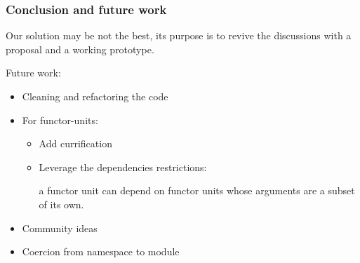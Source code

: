 \documentclass{beamer}
\begin{document}
\begin{frame}
\frametitle{Conclusion and future work}

Our solution may be not the best, its purpose is to revive the discussions with
a proposal and a working prototype. 

\medskip

Future work:
\begin{itemize}
  \item Cleaning and refactoring the code
  \item For functor-units:
    \begin{itemize}
      \item Add currification
      \item Leverage the dependencies restrictions:

        a functor unit can depend on functor units whose arguments are a subset
        of its own.
    \end{itemize}
  \item Community ideas
  \item Coercion from namespace to module
\end{itemize}
\end{frame}
\end{document}
